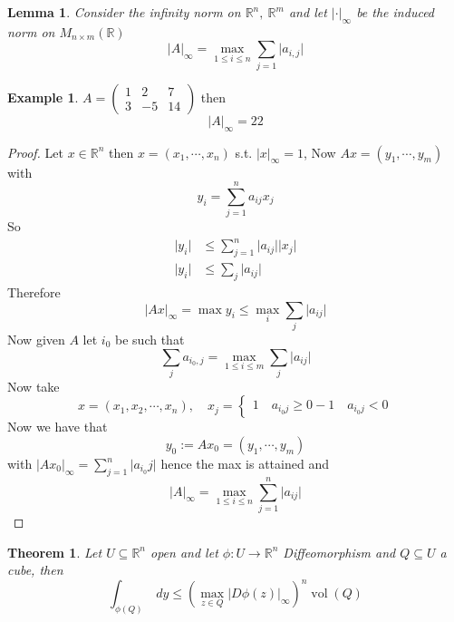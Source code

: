 \documentclass[11pt,openany]{book}
\theoremstyle{plain}
\newtheorem{theorem}{Theorem}[chapter]
\newtheorem{lemma}{Lemma}[chapter]
\theoremstyle{definition}
\newtheorem{example}{Example}[chapter]
\theoremstyle{remark}
\newcommand{\R}{\mathbb{R}}
\newcommand{\vol}{\operatorname{vol}}
\newcommand{\abs}[1]{\lvert #1 \rvert}
\begin{document}
\begin{lemma}
    Consider the infinity norm on $\R^n, \ \R^m$ and let 
    $\abs{\cdot}_\infty$ be the induced norm on $M_{n \times m} (\R)$ 
    $$\abs{A}_\infty = \max_{1 \le i \le n} \sum_{j=1} \abs{a_{i,j}}$$
\end{lemma}

\begin{example}
    $A = \begin{pmatrix}
        1 & 2 & 7 \\
        3 & -5 & 14
    \end{pmatrix}$ then 
    $$\abs{A}_\infty= 22$$
\end{example}

\begin{proof}
    Let $x \in \R^n$ then $x = (x_1, \cdots, x_n)$ s.t. $\abs{x}_\infty = 1$, 
    Now $Ax = (y_1, \cdots, y_m)$ with 
    $$y_i = \sum_{j=1}^n a_{ij} x_j$$
    So 
    \begin{align*}
        \abs{y_i} &\le \sum_{j=1}^n \abs{a_{ij}} \abs{x_j} \\
        \abs{y_i} &\le \sum_{j} \abs{a_{ij}}  
    \end{align*}
    Therefore 
    $$\abs{Ax}_\infty = \max {y_i} \le \max_i \sum_{j} \abs{a_{ij}}$$
    Now given $A$ let $i_0$ be such that 
    $$\sum_j a_{i_0,j} = \max_{1 \le i \le m} \sum_j \abs{a_{ij}}$$
    Now take 
    $$x = (x_1, x_2, \cdots, x_n), \quad x_j =  \begin{cases}
        1 \quad a_{i_0j} \ge 0 
        -1 \quad a_{i_0j} < 0
    \end{cases}$$
    Now we have that 
    $$y_0 := A x_0 = (y_1, \cdots, y_m)$$ 
    with $\abs{A x_0}_\infty = \sum_{j=1}^n \abs{a_{i_0}j}$ hence the max is attained and 
    $$\abs{A}_\infty = \max_{1 \le i \le n} \sum_{j=1}^n \abs{a_{ij}}$$  
\end{proof}

\begin{theorem}
    Let $U \subseteq \R^n$ open and let $\phi \colon U \to \R^n$ Diffeomorphism and 
    $Q \subseteq U$ a cube, then 
    $$\int_{\phi(Q)} \ dy \le (\max_{z \in Q} \abs{D\phi(z)}_\infty)^n \vol (Q)$$
\end{theorem}
\end{document}
